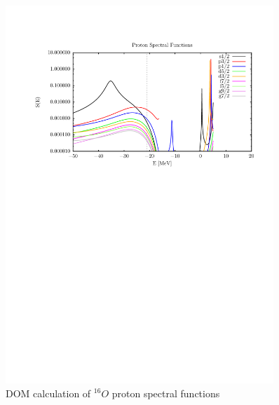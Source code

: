 \begin{figure}
\begin{center}
\includegraphics[width = 0.9\textwidth]{figures/o16_protonSpectralFunctions.png}
\caption{DOM calculation of $^{16}O$ proton spectral functions}
\label{o16ProtonSpectralFunctions}
\end{center}
\end{figure}


